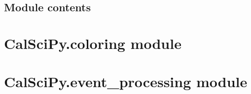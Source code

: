 \documentclass[letterpaper,10pt,english]{sphinxmanual}
\begin{document}
\section{Module contents}
\label{\detokenize{CalSciPy.bruker:module-CalSciPy.bruker}}\label{\detokenize{CalSciPy.bruker:module-contents}}
\sphinxstepscope


\chapter{CalSciPy.coloring module}
\label{\detokenize{CalSciPy.coloring:calscipy-coloring-module}}\label{\detokenize{CalSciPy.coloring::doc}}
\sphinxstepscope


\chapter{CalSciPy.event\_processing module}
\label{\detokenize{CalSciPy.event_processing:module-CalSciPy.event_processing}}\label{\detokenize{CalSciPy.event_processing:calscipy-event-processing-module}}\label{\detokenize{CalSciPy.event_processing::doc}}
\end{document}
